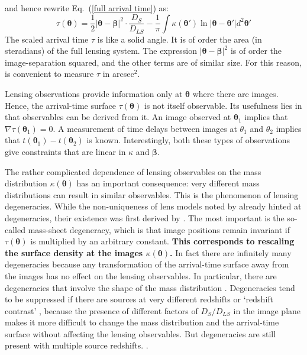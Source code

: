 \documentclass[galley,usenatbib]{mn2e}
\renewcommand{\vec}[1]{\ensuremath{\boldsymbol{#1}}}
\newcommand{\hilight}[1]{{\bf \color{OliveGreen} #1}}
\newcommand{\eqnref}[1] {Eq.~(\ref{#1})}
\begin{document}
%
and hence rewrite \eqnref{full arrival time} as:
%
\begin{equation}
\tau(\vec\theta) = {\textstyle\frac12} |\vec\theta - \vec\beta|^2
                   \cdot \frac{D_{S}}{D_{LS}}
                 - \frac1\pi \int \kappa (\vec\theta')
                   \ln|\vec\theta - \vec\theta'| d^2\vec\theta'
\label{arrival time}
\end{equation}
%
The scaled arrival time $\tau$ is like a solid angle. It is of order the area
(in steradians) of the full lensing system. The expression $|\vec\theta -
\vec\beta|^2$ is of order the image-separation squared, and the other terms are
of similar size.  For this reason, is convenient to measure $\tau$ in
arcsec$^{2}$.

Lensing observations provide information only at $\vec\theta$ where there are
images.  Hence, the arrival-time surface $\tau(\vec\theta)$ is not itself
observable.  Its usefulness lies in that observables can be derived from it.
An image observed at $\vec\theta_1$ implies that $\nabla\tau(\vec\theta_1)=0$.
A measurement of time delays between images at $\theta_1$ and $\theta_2$
implies that $t(\vec\theta_1)-t(\vec\theta_2)$ is known.  Interestingly, both
these types of observations give constraints that are linear in $\kappa$ and
$\vec\beta$.

The rather complicated dependence of lensing observables on the mass
distribution $\kappa(\vec\theta)$ has an important consequence: very different
mass distributions can result in similar observables.  This is the phenomenon
of lensing degeneracies.  While the non-uniqueness of lens models noted by
\cite{1981ApJ...244..736Y} already hinted at degeneracies, their existence was
first derived by \cite{1985ApJ...289L...1F}.  The most important is the
so-called mass-sheet degeneracy, which is that image positions remain invariant
if $\tau(\vec\theta)$ is multiplied by an arbitrary constant.  
\hilight{This corresponds
to rescaling the surface density at the images $\kappa(\vec\theta)$.} In fact
there are infinitely many degeneracies \citep{2000AJ....120.1654S} because any
transformation of the arrival-time surface away from the images has no effect
on the lensing observables.  In particular, there are degeneracies that involve
the shape of the mass distribution
\citep{2006ApJ...653..936S,2013arXiv1306.4675S}.  Degeneracies tend to be
suppressed if there are sources at very different redshifts or `redshift
contrast' \citep{1998AJ....116.1541A,2009ApJ...690..154S}, because the presence
of different factors of $D_S/D_{LS}$ in the image plane makes it more difficult
to change the mass distribution and the arrival-time surface without affecting
the lensing observables.  But degeneracies are still present with multiple
source redshifts.  \citep{2008MNRAS.386..307L}.
\end{document}

